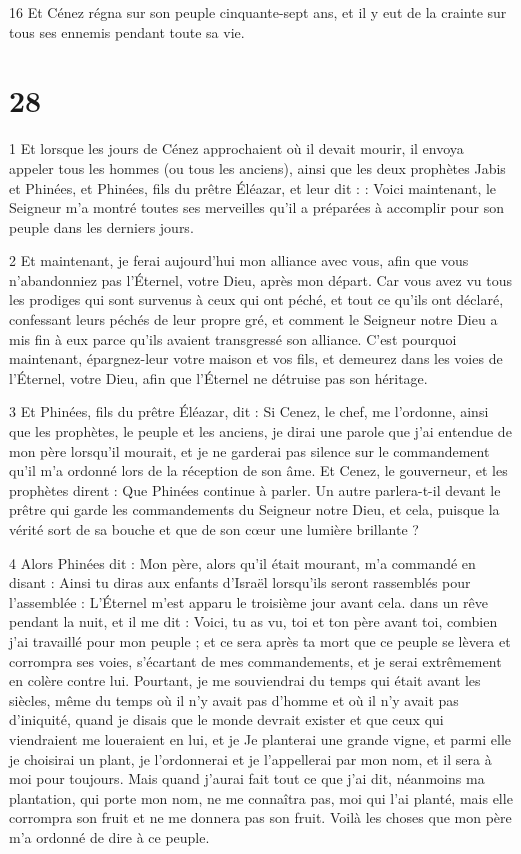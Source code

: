 \par 16 Et Cénez régna sur son peuple cinquante-sept ans, et il y eut de la crainte sur tous ses ennemis pendant toute sa vie.

\chapter{28}

\par 1 Et lorsque les jours de Cénez approchaient où il devait mourir, il envoya appeler tous les hommes (ou tous les anciens), ainsi que les deux prophètes Jabis et Phinées, et Phinées, fils du prêtre Éléazar, et leur dit : : Voici maintenant, le Seigneur m'a montré toutes ses merveilles qu'il a préparées à accomplir pour son peuple dans les derniers jours.

\par 2 Et maintenant, je ferai aujourd'hui mon alliance avec vous, afin que vous n'abandonniez pas l'Éternel, votre Dieu, après mon départ. Car vous avez vu tous les prodiges qui sont survenus à ceux qui ont péché, et tout ce qu'ils ont déclaré, confessant leurs péchés de leur propre gré, et comment le Seigneur notre Dieu a mis fin à eux parce qu'ils avaient transgressé son alliance. C'est pourquoi maintenant, épargnez-leur votre maison et vos fils, et demeurez dans les voies de l'Éternel, votre Dieu, afin que l'Éternel ne détruise pas son héritage.

\par 3 Et Phinées, fils du prêtre Éléazar, dit : Si Cenez, le chef, me l'ordonne, ainsi que les prophètes, le peuple et les anciens, je dirai une parole que j'ai entendue de mon père lorsqu'il mourait, et je ne garderai pas silence sur le commandement qu'il m'a ordonné lors de la réception de son âme. Et Cenez, le gouverneur, et les prophètes dirent : Que Phinées continue à parler. Un autre parlera-t-il devant le prêtre qui garde les commandements du Seigneur notre Dieu, et cela, puisque la vérité sort de sa bouche et que de son cœur une lumière brillante ?

\par 4 Alors Phinées dit : Mon père, alors qu'il était mourant, m'a commandé en disant : Ainsi tu diras aux enfants d'Israël lorsqu'ils seront rassemblés pour l'assemblée : L'Éternel m'est apparu le troisième jour avant cela. dans un rêve pendant la nuit, et il me dit : Voici, tu as vu, toi et ton père avant toi, combien j'ai travaillé pour mon peuple ; et ce sera après ta mort que ce peuple se lèvera et corrompra ses voies, s'écartant de mes commandements, et je serai extrêmement en colère contre lui. Pourtant, je me souviendrai du temps qui était avant les siècles, même du temps où il n'y avait pas d'homme et où il n'y avait pas d'iniquité, quand je disais que le monde devrait exister et que ceux qui viendraient me loueraient en lui, et je Je planterai une grande vigne, et parmi elle je choisirai un plant, je l'ordonnerai et je l'appellerai par mon nom, et il sera à moi pour toujours. Mais quand j'aurai fait tout ce que j'ai dit, néanmoins ma plantation, qui porte mon nom, ne me connaîtra pas, moi qui l'ai planté, mais elle corrompra son fruit et ne me donnera pas son fruit. Voilà les choses que mon père m'a ordonné de dire à ce peuple.

